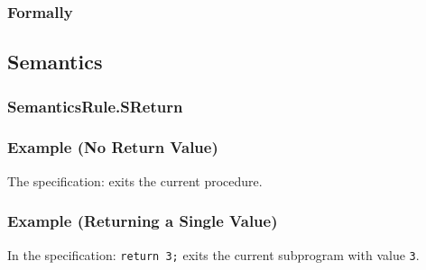 \subsubsection{Formally}
\begin{mathpar}
\end{mathpar}

\begin{mathpar}
\end{mathpar}

\begin{mathpar}
\end{mathpar}

\subsection{Semantics}
\subsubsection{SemanticsRule.SReturn\label{sec:SemanticsRule.SReturn}}
\subsubsection{Example (No Return Value)}
The specification:
exits the current procedure.

\subsubsection{Example (Returning a Single Value)}
In the specification:
\texttt{return 3;} exits the current subprogram with value \texttt{3}.

